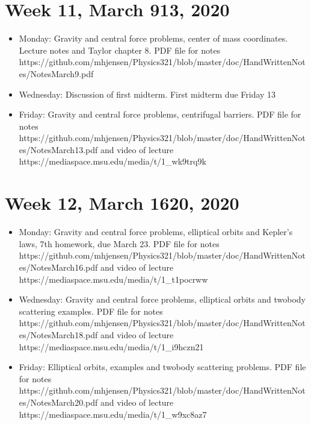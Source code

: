 \documentclass[letterpaper,10pt,english]{sphinxmanual}
\begin{document}
\section{Week 11, March  9\sphinxhyphen{}13, 2020}
\label{\detokenize{intro:week-11-march-9-13-2020}}\begin{itemize}
\item {} 
Monday:  Gravity and central force problems, center of mass coordinates. Lecture notes and Taylor chapter 8. PDF file for notes https://github.com/mhjensen/Physics321/blob/master/doc/HandWrittenNotes/NotesMarch9.pdf

\item {} 
Wednesday: Discussion of first midterm. First midterm due Friday 13

\item {} 
Friday:  Gravity and central force problems, centrifugal barriers. PDF file for notes https://github.com/mhjensen/Physics321/blob/master/doc/HandWrittenNotes/NotesMarch13.pdf and video of lecture https://mediaspace.msu.edu/media/t/1\_wk9trq9k

\end{itemize}


\section{Week 12, March 16\sphinxhyphen{}20, 2020}
\label{\detokenize{intro:week-12-march-16-20-2020}}\begin{itemize}
\item {} 
Monday: Gravity and central force problems, elliptical orbits and Kepler’s laws, 7th homework, due March 23. PDF file for notes https://github.com/mhjensen/Physics321/blob/master/doc/HandWrittenNotes/NotesMarch16.pdf and video of lecture https://mediaspace.msu.edu/media/t/1\_t1pocrww

\item {} 
Wednesday: Gravity and central force problems, elliptical orbits  and two\sphinxhyphen{}body scattering examples. PDF file for notes https://github.com/mhjensen/Physics321/blob/master/doc/HandWrittenNotes/NotesMarch18.pdf and video of lecture https://mediaspace.msu.edu/media/t/1\_i9hczn21

\item {} 
Friday:  Elliptical orbits, examples and two\sphinxhyphen{}body scattering problems. PDF file for notes https://github.com/mhjensen/Physics321/blob/master/doc/HandWrittenNotes/NotesMarch20.pdf and video of lecture https://mediaspace.msu.edu/media/t/1\_w9xc8az7

\end{itemize}
\end{document}

